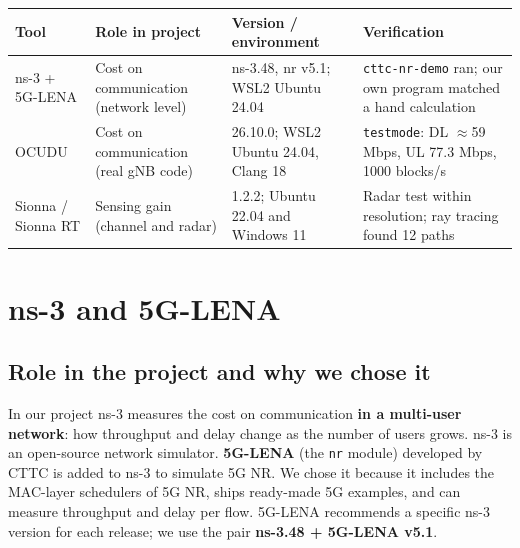 \documentclass[10.5pt,a4paper]{article}
\begin{document}
\begin{center}\sffamily\small
\begin{tabular}{@{}p{2.6cm}p{3.2cm}p{3.5cm}p{4.0cm}@{}}
\toprule
\textbf{Tool} & \textbf{Role in project} & \textbf{Version / environment} & \textbf{Verification} \\
\midrule
ns-3 + 5G-LENA & Cost on communication (network level) & ns-3.48, nr v5.1; WSL2 Ubuntu 24.04 & \texttt{cttc-nr-demo} ran; our own program matched a hand calculation \\
OCUDU & Cost on communication (real gNB code) & 26.10.0; WSL2 Ubuntu 24.04, Clang 18 & \texttt{testmode}: DL $\approx$59 Mbps, UL 77.3 Mbps, 1000 blocks/s \\
Sionna / Sionna RT & Sensing gain (channel and radar) & 1.2.2; Ubuntu 22.04 and Windows 11 & Radar test within resolution; ray tracing found 12 paths \\
\bottomrule
\end{tabular}
\end{center}

\section{ns-3 and 5G-LENA}
\subsection{Role in the project and why we chose it}
In our project ns-3 measures the cost on communication \textbf{in a multi-user network}: how throughput and delay change as the number of users grows. ns-3 is an open-source network simulator. \textbf{5G-LENA} (the \texttt{nr} module) developed by CTTC is added to ns-3 to simulate 5G NR. We chose it because it includes the MAC-layer schedulers of 5G NR, ships ready-made 5G examples, and can measure throughput and delay per flow. 5G-LENA recommends a specific ns-3 version for each release; we use the pair \textbf{ns-3.48 + 5G-LENA v5.1}.
\end{document}
